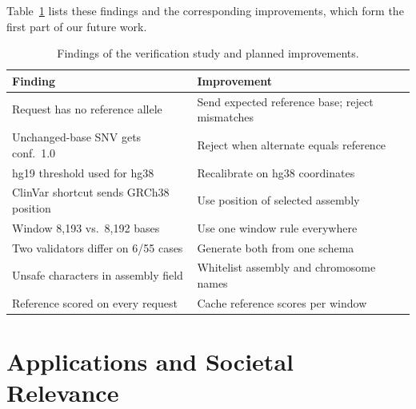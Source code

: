 \documentclass[conference,a4paper]{IEEEtran}
\begin{document}
Table~\ref{tab:fixes} lists these findings and the corresponding improvements, which form the first part of our future work.

\begin{table}[!t]
\caption{Findings of the verification study and planned improvements.}
\label{tab:fixes}
\centering
\footnotesize
\begin{tabular}{@{}p{3.6cm}p{4.2cm}@{}}
\toprule
Finding & Improvement \\
\midrule
Request has no reference allele & Send expected reference base; reject mismatches \\
Unchanged-base SNV gets conf.\ 1.0 & Reject when alternate equals reference \\
hg19 threshold used for hg38 & Recalibrate on hg38 coordinates \\
ClinVar shortcut sends GRCh38 position & Use position of selected assembly \\
Window 8{,}193 vs.\ 8{,}192 bases & Use one window rule everywhere \\
Two validators differ on 6/55 cases & Generate both from one schema \\
Unsafe characters in assembly field & Whitelist assembly and chromosome names \\
Reference scored on every request & Cache reference scores per window \\
\bottomrule
\end{tabular}
\end{table}

\section{Applications and Societal Relevance}
\label{sec:apps}
\end{document}

